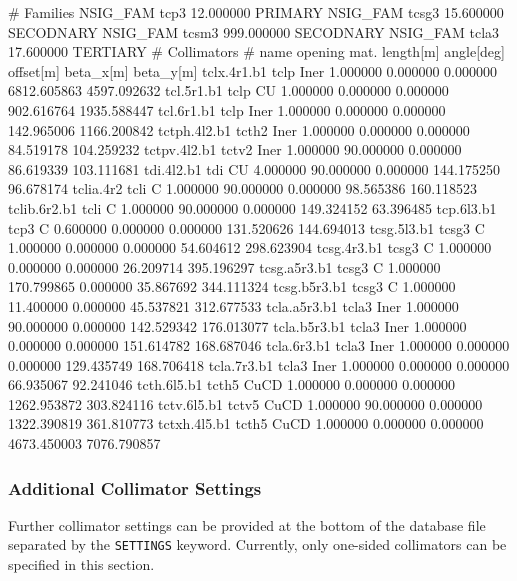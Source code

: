 \begin{cverbatim}
# Families
NSIG_FAM tcp3      12.000000 PRIMARY
NSIG_FAM tcsg3     15.600000 SECODNARY
NSIG_FAM tcsm3    999.000000 SECODNARY
NSIG_FAM tcla3     17.600000 TERTIARY
# Collimators
# name          opening mat.   length[m]  angle[deg]  offset[m]    beta_x[m]    beta_y[m]
tclx.4r1.b1        tclp Iner    1.000000    0.000000   0.000000  6812.605863  4597.092632
tcl.5r1.b1         tclp CU      1.000000    0.000000   0.000000   902.616764  1935.588447
tcl.6r1.b1         tclp Iner    1.000000    0.000000   0.000000   142.965006  1166.200842
tctph.4l2.b1      tcth2 Iner    1.000000    0.000000   0.000000    84.519178   104.259232
tctpv.4l2.b1      tctv2 Iner    1.000000   90.000000   0.000000    86.619339   103.111681
tdi.4l2.b1          tdi CU      4.000000   90.000000   0.000000   144.175250    96.678174
tclia.4r2          tcli C       1.000000   90.000000   0.000000    98.565386   160.118523
tclib.6r2.b1       tcli C       1.000000   90.000000   0.000000   149.324152    63.396485
tcp.6l3.b1         tcp3 C       0.600000    0.000000   0.000000   131.520626   144.694013
tcsg.5l3.b1       tcsg3 C       1.000000    0.000000   0.000000    54.604612   298.623904
tcsg.4r3.b1       tcsg3 C       1.000000    0.000000   0.000000    26.209714   395.196297
tcsg.a5r3.b1      tcsg3 C       1.000000  170.799865   0.000000    35.867692   344.111324
tcsg.b5r3.b1      tcsg3 C       1.000000   11.400000   0.000000    45.537821   312.677533
tcla.a5r3.b1      tcla3 Iner    1.000000   90.000000   0.000000   142.529342   176.013077
tcla.b5r3.b1      tcla3 Iner    1.000000    0.000000   0.000000   151.614782   168.687046
tcla.6r3.b1       tcla3 Iner    1.000000    0.000000   0.000000   129.435749   168.706418
tcla.7r3.b1       tcla3 Iner    1.000000    0.000000   0.000000    66.935067    92.241046
tcth.6l5.b1       tcth5 CuCD    1.000000    0.000000   0.000000  1262.953872   303.824116
tctv.6l5.b1       tctv5 CuCD    1.000000   90.000000   0.000000  1322.390819   361.810773
tctxh.4l5.b1      tcth5 CuCD    1.000000    0.000000   0.000000  4673.450003  7076.790857
\end{cverbatim}

\subsubsection{Additional Collimator Settings}

Further collimator settings can be provided at the bottom of the database file separated by the \texttt{SETTINGS} keyword.
Currently, only one-sided collimators can be specified in this section.

